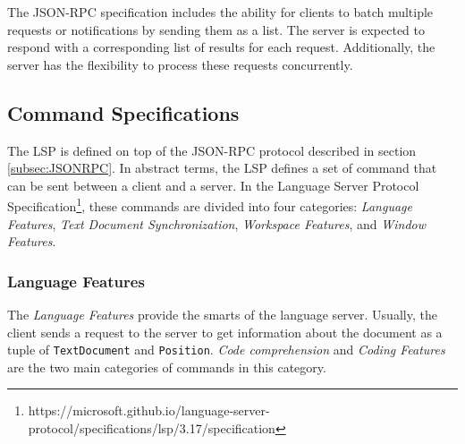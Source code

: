 The JSON-RPC specification includes the ability for clients to batch multiple requests or notifications by sending them as a list. The server is expected to respond with a corresponding list of results for each request. Additionally, the server has the flexibility to process these requests concurrently.

\subsection{Command Specifications}\label{sec:CommandSpecification}
The LSP is defined on top of the JSON-RPC protocol described in section \ref{subsec:JSONRPC}. In abstract terms, the LSP defines a set of command that can be sent between a client and a server. In the Language Server Protocol Specification\footnote{https://microsoft.github.io/language-server-protocol/specifications/lsp/3.17/specification}, these commands are divided into four categories: \textit{Language Features}, \textit{Text Document Synchronization}, \textit{Workspace Features}, and \textit{Window Features}.

\subsubsection{Language Features}\label{subsec:LanguageFeatures}
The \textit{Language Features} provide the smarts of the language server. Usually, the client sends a request to the server to get information about the document as a tuple of \texttt{TextDocument} and \texttt{Position}. \textit{Code comprehension} and \textit{Coding Features} are the two main categories of commands in this category.

